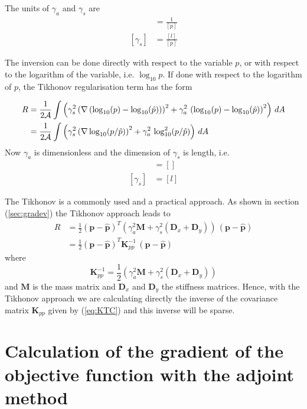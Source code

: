 \documentclass[10pt,a4paper]{book}
\begin{document}
The units of $\gamma_a$ and $\gamma_s$ are 
\begin{align*}
[\gamma_a] &= \frac{1}{[p]} \\
[\gamma_s] &= \frac{[l]}{[p]} 
\end{align*}

The inversion can be done directly with respect to the variable $p$,
or with respect to the logarithm of the variable, i.e.  $\log_{10}
p$. If done with respect to the logarithm of $p$, the Tikhonov
regularisation term has the form

\begin{align}
R & =  \frac{1}{2\cal{A}} \int \left ( \gamma_s^2   \left ( \nabla \left ( \log_{10}(p) - \log_{10}(\hat{p}) \right ) \right )^2 + \gamma_a^2 \, \left (\log_{10}(p)-\log_{10}(\hat{p}) \right )^2 \right ) \, dA \nonumber \\
  & =  \frac{1}{2\cal{A}} \int \left ( \gamma_s^2  \left ( \nabla   \log_{10}(p/\hat{p}) \right )^2   + \gamma_a^2 \,  \log_{10}^2(p/\hat{p})  \right ) \, dA 
\label{eq:TRlog1}
\end{align}
Now $\gamma_a$ is dimensionless and the dimension of $\gamma_s$ is length, i.e. 
\begin{align*}
[\gamma_a] &= [] \\
[\gamma_s] &= [l]
\end{align*}





The Tikhonov is a commonly used and a practical approach. As shown in
section (\ref{sec:gradev}) the Tikhonov approach leads to
\begin{align}
R  &= \frac{1}{2} (\bm{p}-\hat{\bm{p}})^T \left ( \gamma_a^2 \bm{M}  +  \gamma_s^2 (\bm{D}_x + \bm{D}_y) \right ) \, ( \bm{p}-\hat{\bm{p}}) \\
   &= \frac{1}{2} (\bm{p}-\hat{\bm{p}})^T \bm{K}^{-1}_{pp} \, ( \bm{p}-\hat{\bm{p}})
\end{align}
where
\begin{equation}
\bm{K}^{-1}_{pp} = \frac{1}{2}  \left ( \gamma_a^2 \bm{M} +  \gamma^2_s(\bm{D}_x + \bm{D}_y) \right )
\label{eq:KTC}
\end{equation}
and $\bm{M}$ is the mass matrix and $\bm{D}_x$ and $\bm{D}_y$ the
stiffness matrices. Hence, with the Tikhonov approach we are calculating
directly the inverse of the covariance matrix $\bm{K}_{pp}$ given by (\ref{eq:KTC}) and this
inverse will be sparse.


\section{Calculation of the gradient of the objective function with the adjoint method}
\end{document}
